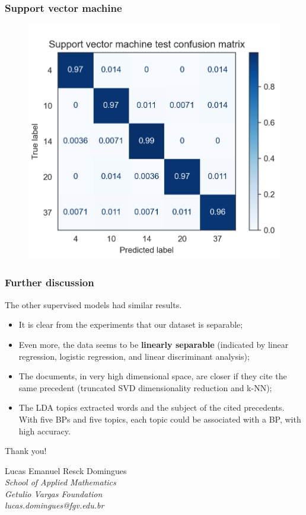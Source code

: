 \documentclass{beamer}
\begin{document}
    \begin{frame}
        \frametitle{Support vector machine}
        \begin{figure}
            \centering
            \includegraphics[width=0.6\linewidth]{svm.png}
        \end{figure}
    \end{frame}

    \begin{frame}
        \frametitle{Further discussion}
        The other supervised models had similar results. \pause

        \begin{itemize}
            \item It is clear from the experiments that our dataset is separable; \pause
            \item Even more, the data seems to be \textbf{linearly separable} (indicated by linear regression, logistic regression, and linear discriminant analysis); \pause
            \item The documents, in very high dimensional space, are closer if they cite the same precedent (truncated SVD dimensionality reduction and k-NN); \pause
            \item The LDA topics extracted words and the subject of the cited precedents. With five BPs and five topics, each topic could be associated with a BP, with high accuracy.
        \end{itemize}
    \end{frame}

    \begin{frame}
        \begin{center}
        {\Huge Thank you!}
        \bigskip
        
        Lucas Emanuel Resck Domingues \\
        \textit{School of Applied Mathematics} \\
        \textit{Getulio Vargas Foundation} \\
        \textit{lucas.domingues@fgv.edu.br}
        \end{center}
    \end{frame}

    \nocite{*}
    
    
\end{document}
